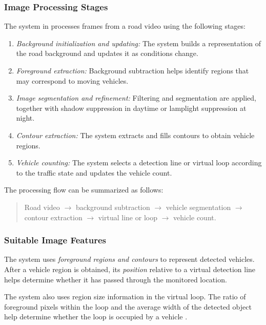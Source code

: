 \documentclass[conference]{IEEEtran}
\begin{document}
	\subsubsection{Image Processing Stages}
	
	The system in \cite{liu2017} processes frames from a road video using
	the following stages:
	
	\begin{enumerate}
		\item \textit{Background initialization and updating:} The system
		builds a representation of the road background and updates it as
		conditions change.
		
		\item \textit{Foreground extraction:} Background subtraction helps
		identify regions that may correspond to moving vehicles.
		
		\item \textit{Image segmentation and refinement:} Filtering and
		segmentation are applied, together with shadow suppression in
		daytime or lamplight suppression at night.
		
		\item \textit{Contour extraction:} The system extracts and fills
		contours to obtain vehicle regions.
		
		\item \textit{Vehicle counting:} The system selects a detection line
		or virtual loop according to the traffic state and updates the
		vehicle count.
	\end{enumerate}
	
	The processing flow can be summarized as follows:
	
	\begin{quote}
		Road video $\rightarrow$ background subtraction $\rightarrow$ vehicle
		segmentation $\rightarrow$ contour extraction $\rightarrow$ virtual
		line or loop $\rightarrow$ vehicle count.
	\end{quote}
	
	\subsubsection{Suitable Image Features}
	
	The system uses \textit{foreground regions and contours} to represent
	detected vehicles. After a vehicle region is obtained, its
	\textit{position} relative to a virtual detection line helps determine
	whether it has passed through the monitored location.
	
	The system also uses region size information in the virtual loop. The
	ratio of foreground pixels within the loop and the average width of the
	detected object help determine whether the loop is occupied by a
	vehicle \cite{liu2017}.
	
\end{document}
